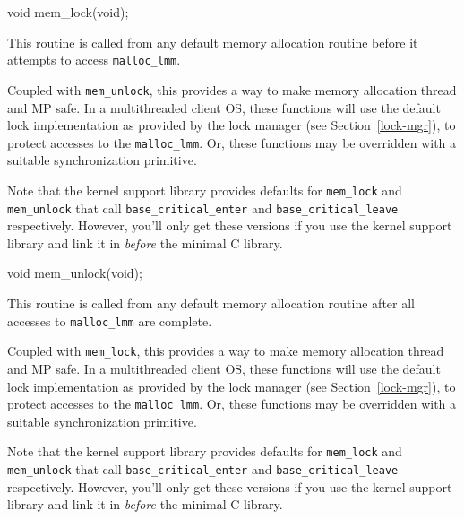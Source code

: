 \label{mem-lock}
\begin{apisyn}

	\funcproto void mem_lock(void);
\end{apisyn}
\begin{apidesc}
	This routine is called from any default memory allocation routine
	before it attempts to access {\tt malloc_lmm}.

	Coupled with {\tt mem_unlock},
	this provides a way to make memory allocation thread and MP safe.
 	In a multithreaded client OS, these functions will use the default
	lock implementation as provided by the lock manager (see
	Section~\ref{lock-mgr}), to protect accesses to	the
	\texttt{malloc_lmm}. Or, these functions may be overridden with a
	suitable synchronization primitive. 

   	Note that the kernel support library provides defaults for
	{\tt mem_lock} and {\tt mem_unlock} that call
	\texttt{base_critical_enter} and \texttt{base_critical_leave}
	respectively.
	However, you'll only get these versions if you use the kernel
	support library and link it in \emph{before} the minimal C library.
\end{apidesc}

\label{mem-unlock}
\begin{apisyn}

	\funcproto void mem_unlock(void);
\end{apisyn}
\begin{apidesc}
	This routine is called from any default memory allocation routine
	after all accesses to {\tt malloc_lmm} are complete.

	Coupled with {\tt mem_lock},
	this provides a way to make memory allocation thread and MP safe.
 	In a multithreaded client OS, these functions will use the default
	lock implementation as provided by the lock manager (see
	Section~\ref{lock-mgr}), to protect accesses to	the
	\texttt{malloc_lmm}. Or, these functions may be overridden with a
	suitable synchronization primitive. 

   	Note that the kernel support library provides defaults for
	{\tt mem_lock} and {\tt mem_unlock} that call
	\texttt{base_critical_enter} and \texttt{base_critical_leave}
	respectively.
	However, you'll only get these versions if you use the kernel
	support library and link it in \emph{before} the minimal C library.
\end{apidesc}


